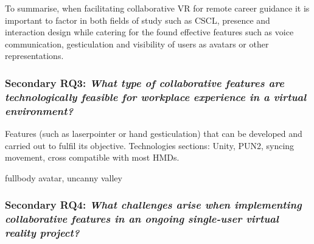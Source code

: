 To summarise, when facilitating collaborative VR for remote
career guidance it is important to factor in both fields of study such as CSCL, presence and interaction design while catering for the found effective features such as voice communication, gesticulation and visibility of users as avatars or other representations.   






\subsubsection{Secondary RQ3: \textit{What type of collaborative features are technologically feasible for workplace experience in a virtual environment?}} 
\label{discussion:RQ3}

Features (such as laserpointer or hand gesticulation) that can be developed and carried out to fulfil its objective.
Technologies sections: Unity, PUN2, syncing movement, cross compatible with most HMDs.  

fullbody avatar, uncanny valley 



\subsubsection{Secondary RQ4: \textit{What challenges arise when implementing collaborative features in an ongoing
single-user virtual reality project?}} 

